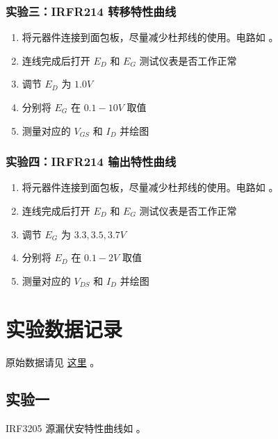 \documentclass[lang=cn,11pt,a4paper,cite=authoryear]{elegantpaper}
\begin{document}

\subsubsection{实验三：IRFR214 转移特性曲线}

\begin{enumerate}
    \item 将元器件连接到面包板，尽量减少杜邦线的使用。电路如  。
    \item 连线完成后打开 \(E_D\) 和 \(E_G\) 测试仪表是否工作正常
    \item 调节 \(E_D\) 为 \(1.0 V\) 
    \item 分别将 \(E_G\) 在 \(0.1 - 10 V\) 取值
    \item 测量对应的 \(V_{GS}\) 和  \(I_D\) 并绘图
\end{enumerate}



\subsubsection{实验四：IRFR214 输出特性曲线}


\begin{enumerate}
    \item 将元器件连接到面包板，尽量减少杜邦线的使用。电路如  。
    \item 连线完成后打开 \(E_D\) 和 \(E_G\) 测试仪表是否工作正常
    \item 调节 \(E_G\) 为 \(3.3, 3.5, 3.7 V\) 
    \item 分别将 \(E_D\) 在 \(0.1 - 2 V\) 取值
    \item 测量对应的 \(V_{DS}\) 和  \(I_D\) 并绘图
\end{enumerate}


\section{实验数据记录}

原始数据请见 \href{https://github.com/PannenetsF/Mirco-Electronic-Device-Experiment/tree/main/homework/hw09}{这里} 。

\subsection{实验一}

IRF3205 源漏伏安特性曲线如 。
\end{document}

